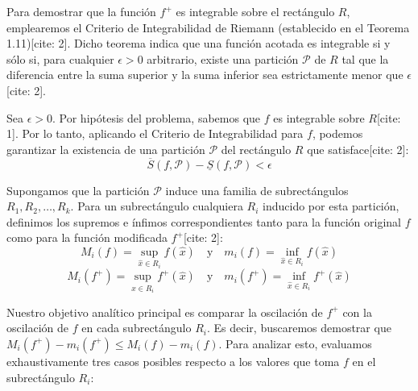 \documentclass[11pt,letterpaper]{article}
\begin{document}
Para demostrar que la función $f^{+}$ es integrable sobre el rectángulo $R$, emplearemos el Criterio de Integrabilidad de Riemann (establecido en el Teorema 1.11)[cite: 2]. Dicho teorema indica que una función acotada es integrable si y sólo si, para cualquier $\epsilon > 0$ arbitrario, existe una partición $\mathcal{P}$ de $R$ tal que la diferencia entre la suma superior y la suma inferior sea estrictamente menor que $\epsilon$[cite: 2].

Sea $\epsilon > 0$. Por hipótesis del problema, sabemos que $f$ es integrable sobre $R$[cite: 1]. Por lo tanto, aplicando el Criterio de Integrabilidad para $f$, podemos garantizar la existencia de una partición $\mathcal{P}$ del rectángulo $R$ que satisface[cite: 2]:
\begin{equation*}
\overline{S}(f,\mathcal{P}) - \underline{S}(f,\mathcal{P}) < \epsilon
\end{equation*}

Supongamos que la partición $\mathcal{P}$ induce una familia de subrectángulos $R_{1}, R_{2}, \dots, R_{k}$. Para un subrectángulo cualquiera $R_{i}$ inducido por esta partición, definimos los supremos e ínfimos correspondientes tanto para la función original $f$ como para la función modificada $f^{+}$[cite: 2]:
\begin{equation*}
M_{i}(f) = \sup_{\hat{x} \in R_{i}} f(\hat{x}) \quad \text{y} \quad m_{i}(f) = \inf_{\hat{x} \in R_{i}} f(\hat{x})
\end{equation*}
\begin{equation*}
M_{i}(f^{+}) = \sup_{\hat{x} \in R_{i}} f^{+}(\hat{x}) \quad \text{y} \quad m_{i}(f^{+}) = \inf_{\hat{x} \in R_{i}} f^{+}(\hat{x})
\end{equation*}

Nuestro objetivo analítico principal es comparar la oscilación de $f^{+}$ con la oscilación de $f$ en cada subrectángulo $R_{i}$. Es decir, buscaremos demostrar que $M_{i}(f^{+}) - m_{i}(f^{+}) \le M_{i}(f) - m_{i}(f)$.
Para analizar esto, evaluamos exhaustivamente tres casos posibles respecto a los valores que toma $f$ en el subrectángulo $R_{i}$:
\end{document}
